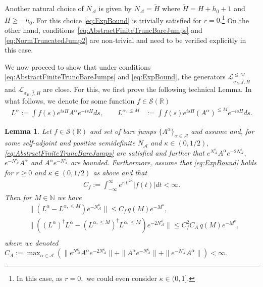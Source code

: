 \documentclass[11pt]{amsart}
\newcommand{\1}{\mathbbm{1}}
\newcommand{\N}{\mathbb{N}}
\newcommand{\NA}{N_{\mathcal{A}}}
\newcommand{\cA}{\mathcal{A}}
\newcommand{\bin}[1]{}
\theoremstyle{plain}
\newtheorem{lemma}[theorem]{Lemma}
\theoremstyle{definition}
\theoremstyle{remark}
\numberwithin{equation}{section}
\begin{document}
Another natural choice of $\NA$ is given by $\NA = \widetilde H$ where $\widetilde H = H +h_0+1$ and $H \ge -h_0.$ For this choice \eqref{eq:ExpBound} is trivially satisfied for $r=0.$\footnote{In this case, as $r=0,$ we could even consider $\kappa\in(0,1]$.} On the other hand, conditions~\eqref{eq:AbstractFiniteTruncBareJumps} and \eqref{eq:NormTruncatedJump2} are non-trivial and need to be verified explicitly in this case.

We now proceed to show that under conditions \eqref{eq:AbstractFiniteTruncBareJumps} and \eqref{eq:ExpBound}, the generators $\mathcal{L}^{\le M}_{\sigma_E,\widehat{f},H}$ and $\mathcal{L}_{\sigma_E,\widehat{f},H}$ are close. For this, we first prove the following technical Lemma. In what follows, we denote for some function $f\in\mathcal{S}(\mathbb{R})$
\begin{align*}L^\alpha:=\int f(s)e^{isH}A^\alpha e^{-isH}ds,\qquad 
\bin{L^{\alpha}^d:=\int f(s)e^{isH}a_i^\dagger e^{-isH}ds}
L^{\alpha,\le M}&:=\int f(s)e^{isH}(A^{\alpha})^{\le M} e^{-isH}ds.\bin{\qquad L_{i}^{\le M,d}:=\int f(s)e^{isH}(a^{\le M})^\dagger_i e^{-isH}ds.}
\end{align*}

\begin{lemma}\label{lem:integralrepapproxTrunc}
Let $f\in\mathcal{S}(\mathbb{R})$ and set of bare jumps $\{A^\alpha\}_{\alpha\in\cA}$ and assume   and, for some self-adjoint and positive semidefinite $\NA$ and $\kappa\in(0,1/2),$  \eqref{eq:AbstractFiniteTruncBareJumps}  are satisfied and further that $e^{\NA^\kappa}A^{\alpha}e^{-2\NA^{\kappa}},$ $e^{-\NA^{\kappa}}A^{\alpha}$ and $A^{\alpha}e^{-\NA^{\kappa}}$ are bounded.
Furthermore, assume that \eqref{eq:ExpBound} holds for $r\ge 0$ and $\kappa\in(0,1/2)$ as above and that
\begin{align}
\label{eq:C_f}
    C_f := \int_{-\infty}^{\infty} e^{r|t|^{2\kappa}} |f(t)|dt < \infty.
\end{align}
Then for $M\in \N$ we have
\begin{align*}
&\|(L^{\alpha}\!-\!L^{\alpha,\le M})e^{-\NA^\kappa}\|\!\le\! C_f\,q(M) e^{-M^{\kappa}},\\
\bin{&\|(L^{d}_{i}\!-\!L^{\le M,d}_{i})e^{-\NA^{\kappa}}\|\!\lesssim  C_f\,\sqrt{M}e^{-\sqrt{M}},\, \,\\}
&\|((L^\alpha)^\dagger L^{\alpha}-\left(L^{\alpha,\le M}\right)^\dagger L^{\alpha,\le M})e^{-2\NA^{\kappa}}\|\le C^2_f C_{A}\,q(M)e^{-M^\kappa},\, \\
\end{align*}
where we denoted $C_A := \max_{\alpha\in\cA}\left(\|e^{\NA^{\kappa}}A^{\alpha}e^{-2\NA^{\kappa}}\|+\|A^{\alpha}e^{-\NA^{\kappa}}\|+\|e^{-\NA^{\kappa}}A^{\alpha}\|\right)<\infty.$
\end{lemma}
\end{document}

